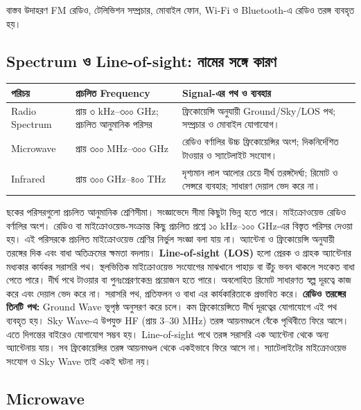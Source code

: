 \begin{examplebox}{বাস্তব উদাহরণ}
FM রেডিও, টেলিভিশন সম্প্রচার, মোবাইল ফোন, Wi-Fi ও Bluetooth-এ রেডিও তরঙ্গ ব্যবহৃত হয়।
\end{examplebox}

\subsection{Spectrum ও Line-of-sight: নামের সঙ্গে কারণ}
\begin{tabularx}{\linewidth}{|p{.18\linewidth}|p{.26\linewidth}|X|}\hline
\textbf{পরিচয়} & \textbf{প্রচলিত Frequency} & \textbf{Signal-এর পথ ও ব্যবহার}\\\hline
Radio Spectrum & প্রায় ৩ kHz--৩০০ GHz; প্রচলিত আনুমানিক পরিসর & ফ্রিকোয়েন্সি অনুযায়ী Ground/Sky/LOS পথ; সম্প্রচার ও মোবাইল যোগাযোগ।\\\hline
Microwave & প্রায় ৩০০ MHz--৩০০ GHz & রেডিও বর্ণালির উচ্চ ফ্রিকোয়েন্সির অংশ; দিকনির্দেশিত টাওয়ার ও স্যাটেলাইট সংযোগ।\\\hline
Infrared & প্রায় ৩০০ GHz--৪০০ THz & দৃশ্যমান লাল আলোর চেয়ে দীর্ঘ তরঙ্গদৈর্ঘ্য; রিমোট ও সেন্সরে ব্যবহার; সাধারণ দেয়াল ভেদ করে না।\\\hline
\end{tabularx}
ছকের পরিসরগুলো প্রচলিত আনুমানিক শ্রেণিসীমা। সংজ্ঞাভেদে সীমা কিছুটা ভিন্ন হতে পারে। মাইক্রোওয়েভ রেডিও বর্ণালির অংশ। রেডিও বা মাইক্রোওয়েভ-সংক্রান্ত কিছু প্রচলিত প্রশ্নে ১০ kHz--১০০ GHz-এর বিস্তৃত পরিসর দেওয়া হয়। এই পরিসরকে প্রচলিত মাইক্রোওয়েভ শ্রেণির নির্ভুল সংজ্ঞা বলা যায় না। অ্যান্টেনা ও ফ্রিকোয়েন্সি অনুযায়ী তরঙ্গের দিক এবং বাধা অতিক্রমের ক্ষমতা বদলায়।
\textbf{Line-of-sight (LOS)} হলো প্রেরক ও গ্রাহক অ্যান্টেনার মধ্যকার কার্যকর সরাসরি পথ। স্থলভিত্তিক মাইক্রোওয়েভ সংযোগের মাঝখানে পাহাড় বা উঁচু ভবন থাকলে সংকেত বাধা পেতে পারে। দীর্ঘ পথে টাওয়ার বা পুনঃপ্রেরণকেন্দ্র প্রয়োজন হতে পারে। অবলোহিত রিমোট সাধারণত স্বল্প দূরত্বে কাজ করে এবং দেয়াল ভেদ করে না। সরাসরি পথ, প্রতিফলন ও বাধা এর কার্যকারিতাকে প্রভাবিত করে।
\textbf{রেডিও তরঙ্গের তিনটি পথ:} Ground Wave ভূপৃষ্ঠ অনুসরণ করে চলে। কম ফ্রিকোয়েন্সিতে দীর্ঘ দূরত্বের যোগাযোগে এই পথ ব্যবহৃত হয়। Sky Wave-এ উপযুক্ত HF (প্রায় 3--30 MHz) তরঙ্গ আয়নমণ্ডলে বেঁকে পৃথিবীতে ফিরে আসে। এতে দিগন্তের বাইরেও যোগাযোগ সম্ভব হয়। Line-of-sight পথে তরঙ্গ সরাসরি এক অ্যান্টেনা থেকে অন্য অ্যান্টেনায় যায়। সব ফ্রিকোয়েন্সির তরঙ্গ আয়নমণ্ডল থেকে একইভাবে ফিরে আসে না। স্যাটেলাইটের মাইক্রোওয়েভ সংযোগ ও Sky Wave তাই একই ঘটনা নয়।

\subsection{Microwave}

